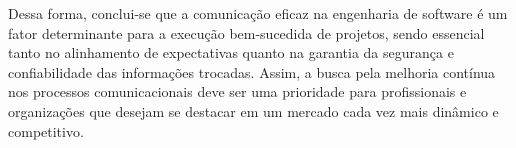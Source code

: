 \documentclass[12pt,oneside,a4paper,article]{abntex2}
\begin{document}
Dessa forma, conclui-se que a comunicação eficaz na engenharia de software é um fator determinante para a execução bem-sucedida de projetos, sendo essencial tanto no alinhamento de expectativas quanto na garantia da segurança e confiabilidade das informações trocadas. Assim, a busca pela melhoria contínua nos processos comunicacionais deve ser uma prioridade para profissionais e organizações que desejam se destacar em um mercado cada vez mais dinâmico e competitivo.



\cite{Bergamini}  
\cite{Alves}
\cite{PMBOK}
\cite{Rajkumar}
\cite{Leonardo}
\cite{Izumi}
\cite{Michelle}
\cite{Teixeira}
\cite{Andrelo}
\cite{Bernardo}
\end{document}
